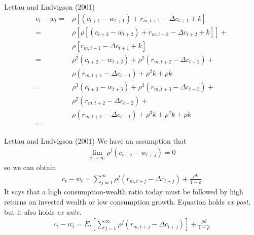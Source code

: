 \documentclass{beamer}
\begin{document}
\begin{frame}{Lettau and Ludvigson (2001)}
	\begin{align*}
		c_{t}-w_{t}=&\rho \left[\left(c_{t+1}-w_{t+1}\right)+r_{m,t+1}-\Delta c_{t+1}+k\right]\\
		= &\rho \left[\rho \left[\left(c_{t+2}-w_{t+2}\right)+r_{m,t+2}-\Delta c_{t+2}+k\right] \right] + \\
		& \rho \left[ r_{m,t+1}-\Delta c_{t+1}+k \right]\\
		= & \rho^2 \left(c_{t+2}-w_{t+2}\right) + \rho^2 \left(r_{m,t+2}-\Delta c_{t+2}\right) + \\
		& \rho \left(r_{m,t+1}-\Delta c_{t+1}\right) + \rho^2 k + \rho k \\
		= & \rho^3 \left(c_{t+3}-w_{t+3}\right) + \rho^3 \left(r_{m,t+3}-\Delta c_{t+3}\right) + \\
		& \rho^2 \left(r_{m,t+2}-\Delta c_{t+2}\right) + \\
		& \rho \left(r_{m,t+1}-\Delta c_{t+1}\right)+ \rho^3 k + \rho^2 k + \rho k \\
		...\\
	\end{align*}
\end{frame}

\begin{frame}{Lettau and Ludvigson (2001)}
	We have an assumption that 
	\begin{align*}
		\lim _{j \rightarrow \infty} \rho^{j}\left(c_{t+j}-w_{t+j}\right)=0
	\end{align*}
	so we can obtain
	\begin{align}
		c_t - w_t = \sum_{j=1}^{\infty} \rho^{j}\left(r_{m, t+j}-\Delta c_{t+j}\right)+\frac{\rho k}{1-\rho}
	\end{align}
	It says that a high consumption-wealth ratio today must be followed by high returns on invested wealth or low consumption growth. Equation holds \textit{ex post}, but it also
	holds \textit{ex ante}.
	\begin{align}
		c_t - w_t = E_t \left[\sum_{j=1}^{\infty} \rho^{j}\left(r_{m, t+j}-\Delta c_{t+j}\right)\right] +\frac{\rho k}{1-\rho}\label{consumptionwealthratio}
	\end{align}
	
\end{frame}
\end{document}
